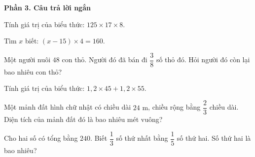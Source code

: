 \textbf{Phần 3. Câu trả lời ngắn}

\begin{ex} %
Tính giá trị của biểu thức: $125 \times 17 \times 8$.
\end{ex}

\begin{ex} %
Tìm $x$ biết: $(x - 15) \times 4 = 160$.
\end{ex}

\begin{ex} %
Một người nuôi $48$ con thỏ. Người đó đã bán đi $\dfrac{3}{8}$ số thỏ đó. Hỏi người đó còn lại bao nhiêu con thỏ?
\end{ex}

\begin{ex} %
Tính giá trị của biểu thức: $1{,}2 \times 45 + 1{,}2 \times 55$.
\end{ex}

\begin{ex} %
Một mảnh đất hình chữ nhật có chiều dài $24\text{ m}$, chiều rộng bằng $\dfrac{2}{3}$ chiều dài. Diện tích của mảnh đất đó là bao nhiêu mét vuông?
\end{ex}

\begin{ex} %
Cho hai số có tổng bằng $240$. Biết $\dfrac{1}{3}$ số thứ nhất bằng $\dfrac{1}{5}$ số thứ hai. Số thứ hai là bao nhiêu?
\end{ex}

